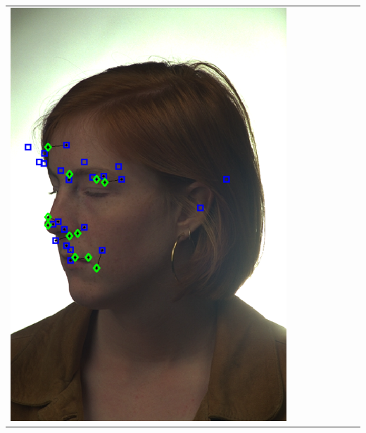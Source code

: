 \documentclass[portrait,final,a0paper,fontscale=0.277]{baposter}
\begin{document}
\begin{poster}
{{\begin{tabular}{@{}rccccccc@{}}
\parbox[c]{0.11\linewidth}{\includegraphics[width=\linewidth]{images/l_hl_fail.pdf}} &

\end{tabular}}}
\end{poster}
\end{document}
